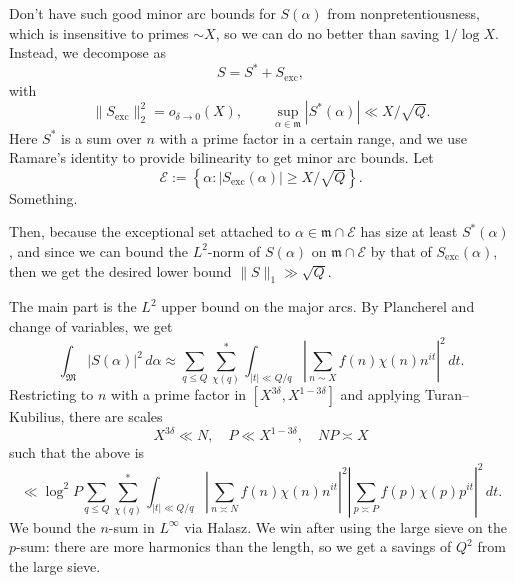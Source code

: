 \documentclass[reqno]{amsart} 
\begin{document}
Don't have such good minor arc bounds for $S (\alpha) $ from nonpretentiousness, which is insensitive to primes $\sim X$, so we can do no better than saving $1 / \log X$.  Instead, we decompose as
\begin{equation*}
S = S^* + S_{\mathrm{exc}},
\end{equation*}
with
\begin{equation*}
  \lVert S_{\mathrm{exc}} \rVert_2^2 =
  o_{\delta \rightarrow 0} (X) ,
  \qquad
  \sup_{\alpha \in \mathfrak{m} } \left\lvert S^\ast (\alpha ) \right\rvert \ll X / \sqrt{Q}.
\end{equation*}
Here $S^\ast $ is a sum over $n$ with a prime factor in a certain range, and we use Ramare's identity to provide bilinearity to get minor arc bounds.  Let
\begin{equation*}
\mathcal{E} := \left\{ \alpha : \left\lvert S_{\mathrm{exc}} (\alpha)  \right\rvert \geq X / \sqrt{Q} \right\}.
\end{equation*}
Something.

Then, because the exceptional set attached to $\alpha \in \mathfrak{m} \cap \mathcal{E}$ has size at least $S^*(\alpha)$, and since we can bound the $L^2$-norm of $S(\alpha)$ on $\mathfrak{m} \cap \mathcal{E}$ by that of $S_{\mathrm{exc}}(\alpha)$, then we get the desired lower bound $\lVert S \rVert_1 \gg \sqrt{Q}$.

The main part is the $L^2$ upper bound on the major arcs.  By Plancherel and change of variables, we get
\begin{equation*}
  \int_{\mathfrak{M} } \lvert S (\alpha)  \rvert^2 \, d \alpha
  \approx
  \sum_{q \leq Q} \sum_{\chi(q)}^\ast \int_{\lvert t \rvert \ll Q / q}
  \left\lvert \sum_{n \sim X} f (n) \chi (n) n^{i t} \right\rvert^2 \, d t.
\end{equation*}
Restricting to $n$ with a prime factor in $[X^{3 \delta}, X^{1 - 3 \delta }]$ and applying Turan--Kubilius, there are scales
\begin{equation*}
  X^{3 \delta } \ll N, \quad P \ll X^{1 - 3 \delta }, \quad
  N P \asymp X
\end{equation*}
such that the above is
\begin{equation*}
  \ll \log^2 P
  \sum_{q \leq Q}
  \sum_{\chi (q)}^\ast
  \int_{\lvert t \rvert \ll Q/q}
  \left\lvert \sum_{n \asymp N} f (n) \chi (n) n^{i t } \right\rvert^2
  \left\lvert \sum_{p \asymp P} f (p) \chi (p) p^{i t} \right\rvert^2 \, d t.
\end{equation*}
We bound the $n$-sum in $L^\infty$ via Halasz.  We win after using the large sieve on the $p$-sum: there are more harmonics than the length, so we get a savings of $Q^2 $ from the large sieve.
\end{document}
